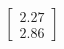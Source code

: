 \documentclass[preview]{standalone}
\begin{document}
\begin{align*}
\begin{bmatrix} 2.27 \\ 2.86 \end{bmatrix}
\end{align*}
\end{document}
